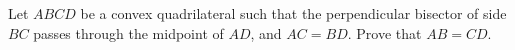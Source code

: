 Let $ABCD$ be a convex quadrilateral such that the perpendicular bisector of side $BC$ passes through the midpoint of $AD$, and $AC=BD$. Prove that $AB=CD$.
